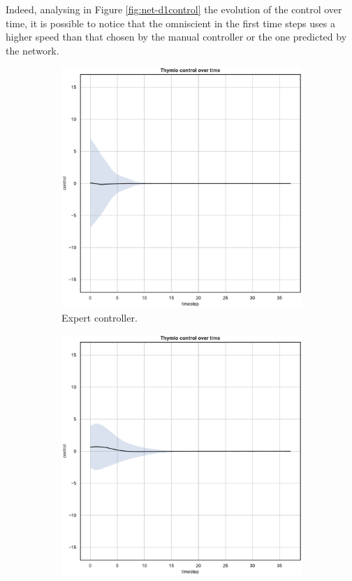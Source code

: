 Indeed, analysing in Figure \ref{fig:net-d1control} the evolution of the control 
over time, it is possible to notice that the omniscient in the first time steps uses a 
higher speed than that chosen by the manual controller or the one predicted by 
the network. 
\begin{figure}[!htb]
	\centering
	\begin{subfigure}[h]{0.3\textwidth}
		\centering
		\includegraphics[width=\textwidth]{contents/images/net-d1/control-overtime-omniscient}%
		\caption{Expert controller.}
	\end{subfigure}
	\hfill
	\begin{subfigure}[h]{0.3\textwidth}
		\centering
		\includegraphics[width=\textwidth]{contents/images/net-d1/control-overtime-manual}%

\end{subfigure}
\end{figure}
